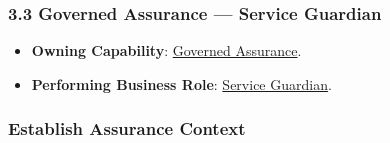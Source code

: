 \subsubsection*{3.3 Governed Assurance — Service Guardian}
\label{rad:assurance:93}

\begin{itemize}

\item
\textbf{Owning Capability}: \hyperref[rad:enabling:694]{Governed Assurance}.



\item
\textbf{Performing Business Role}: \href{https://github.com/fhirfactory/harmonia/blob/98410db60155198a75f74c79d98060070209faa1/docs/markdown/03-business-architecture/actors-roles/roles.md\#service-guardian}{Service Guardian}.



\end{itemize}
\label{rad:assurance:96}



\label{rad:assurance:98}
\subsubsection*{Establish Assurance Context}
\label{rad:assurance:100}

